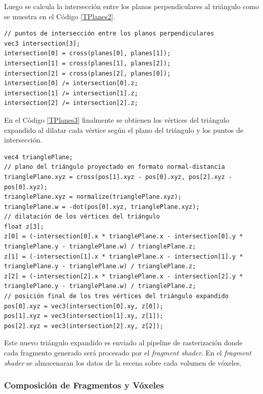Luego se calcula la intersección entre los planos perpendiculares al triángulo como se muestra en el Código \ref{TPlanes2}.
\\
\begin{lstlisting}[caption={Intersección entre planos perpendiculares al triángulo proyectado.}, label=TPlanes2]
// puntos de intersección entre los planos perpendiculares
vec3 intersection[3];
intersection[0] = cross(planes[0], planes[1]);
intersection[1] = cross(planes[1], planes[2]);
intersection[2] = cross(planes[2], planes[0]);
intersection[0] /= intersection[0].z;
intersection[1] /= intersection[1].z;
intersection[2] /= intersection[2].z;
\end{lstlisting}

En el Código \ref{TPlanes3} finalmente se obtienen los vértices del triángulo expandido al dilatar cada vértice según el plano del triángulo y los puntos de intersección.
\\
\begin{lstlisting}[caption={Vértices del triángulo expandido.}, label=TPlanes3]
vec4 trianglePlane;
// plano del triángulo proyectado en formato normal-distancia
trianglePlane.xyz = cross(pos[1].xyz - pos[0].xyz, pos[2].xyz - pos[0].xyz);
trianglePlane.xyz = normalize(trianglePlane.xyz);
trianglePlane.w = -dot(pos[0].xyz, trianglePlane.xyz);
// dilatación de los vértices del triángulo
float z[3];
z[0] = (-intersection[0].x * trianglePlane.x - intersection[0].y * trianglePlane.y - trianglePlane.w) / trianglePlane.z;
z[1] = (-intersection[1].x * trianglePlane.x - intersection[1].y * trianglePlane.y - trianglePlane.w) / trianglePlane.z;
z[2] = (-intersection[2].x * trianglePlane.x - intersection[2].y * trianglePlane.y - trianglePlane.w) / trianglePlane.z;
// posición final de los tres vértices del triángulo expandido
pos[0].xyz = vec3(intersection[0].xy, z[0]);
pos[1].xyz = vec3(intersection[1].xy, z[1]);
pos[2].xyz = vec3(intersection[2].xy, z[2]);
\end{lstlisting}

Este nuevo triángulo expandido es enviado al pipeline de rasterización donde cada fragmento generado será procesado por el \emph{fragment shader}. En el \emph{fragment shader} se almacenaran los datos de la escena sobre cada volumen de vóxeles.

\subsubsection{Composición de Fragmentos y Vóxeles}

